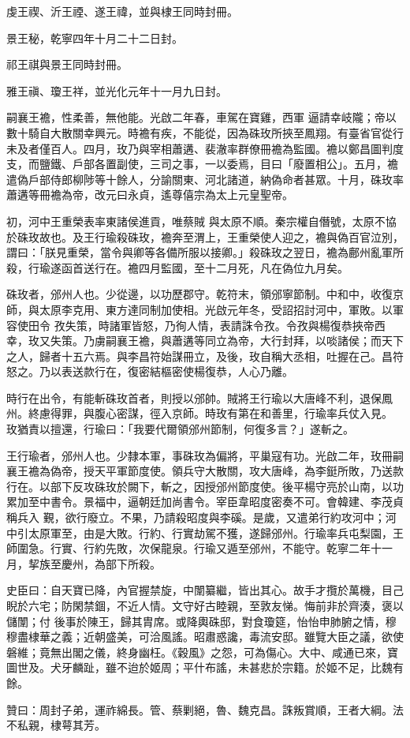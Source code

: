 \begin{pinyinscope}
 虔王禊、沂王禋、遂王禕，並與棣王同時封冊。



 景王秘，乾寧四年十月二十二日封。



 祁王祺與景王同時封冊。



 雅王禛、瓊王祥，並光化元年十一月九日封。



 嗣襄王襜，性柔善，無他能。光啟二年春，車駕在寶雞，西軍
 逼請幸岐隴；帝以數十騎自大散關幸興元。時襜有疾，不能從，因為硃玫所挾至鳳翔。有臺省官從行未及者僅百人。四月，玫乃與宰相蕭遘、裴澈率群僚冊襜為監國。襜以鄭昌圖判度支，而鹽鐵、戶部各置副使，三司之事，一以委焉，目曰「廢置相公」。五月，襜遣偽戶部侍郎柳陟等十餘人，分諭關東、河北諸道，納偽命者甚眾。十月，硃玫率蕭遘等冊襜為帝，改元曰永貞，遙尊僖宗為太上元皇聖帝。



 初，河中王重榮表率東諸侯進貢，唯蔡賊
 與太原不順。秦宗權自僭號，太原不協於硃玫故也。及王行瑜殺硃玫，襜奔至渭上，王重榮使人迎之，襜與偽百官泣別，謂曰：「朕見重榮，當令與卿等各備所服以接卿。」殺硃玫之翌日，襜為鄜州亂軍所殺，行瑜遂函首送行在。襜四月監國，至十二月死，凡在偽位九月矣。



 硃玫者，邠州人也。少從邊，以功歷郡守。乾符末，領邠寧節制。中和中，收復京師，與太原李克用、東方達同制加使相。光啟元年冬，受詔招討河中，軍敗。以軍容使田令
 孜失策，時諸軍皆怒，乃徇人情，表請誅令孜。令孜與楊復恭挾帝西幸，玫又失策。乃虜嗣襄王襜，與蕭遘等同立為帝，大行封拜，以啖諸侯；而天下之人，歸者十五六焉。與李昌符始謀冊立，及後，玫自稱大丞相，吐握在己。昌符怒之。乃以表送款行在，復密結樞密使楊復恭，人心乃離。



 時行在出令，有能斬硃玫首者，則授以邠帥。賊將王行瑜以大唐峰不利，退保鳳州。終慮得罪，與腹心密謀，徑入京師。時玫有第在和善里，行瑜率兵仗入見。
 玫猶責以擅還，行瑜曰：「我要代爾領邠州節制，何復多言？」遂斬之。



 王行瑜者，邠州人也。少隸本軍，事硃玫為偏將，平巢寇有功。光啟二年，玫冊嗣襄王襜為偽帝，授天平軍節度使。領兵守大散關，攻大唐峰，為李鋌所敗，乃送款行在。以部下反攻硃玫於闕下，斬之，因授邠州節度使。後平楊守亮於山南，以功累加至中書令。景福中，逼朝廷加尚書令。宰臣韋昭度密奏不可。會韓建、李茂貞稱兵入
 覲，欲行廢立。不果，乃請殺昭度與李磎。是歲，又遣弟行約攻河中；河中引太原軍至，由是大敗。行約、行實劫駕不獲，遂歸邠州。行瑜率兵屯梨園，王師圍急。行實、行約先敗，次保龍泉。行瑜又遁至邠州，不能守。乾寧二年十一月，挈族至慶州，為部下所殺。



 史臣曰：自天寶已降，內官握禁旋，中闈纂繼，皆出其心。故手才攬於萬機，目己睨於六宅；防閑禁錮，不近人情。文守好古睦親，至敦友悌。悔前非於齊湊，褒以儲闈；付
 後事於陳王，歸其胄席。或降輿硃邸，對食瓊筵，怡怡申肺腑之情，穆穆盡棣華之義；近朝盛美，可洽風謠。昭肅惑讒，毒流安邸。雖覽大臣之議，欲使磐維；竟無出閣之儀，終身幽枉。《穀風》之怨，可為傷心。大中、咸通已來，寶圖世及。犬牙麟趾，雖不迨於姬周；平什布謠，未甚悲於宗籍。於姬不足，比魏有餘。



 贊曰：周封子弟，運祚綿長。管、蔡剿絕，魯、魏克昌。誅叛賞順，王者大綱。法不私親，棣萼其芳。



\end{pinyinscope}